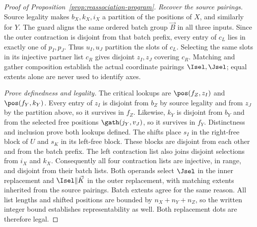 \label{app:reassociation-proof}
\begin{proof}[Proof of Proposition~\ref{prop:reassociation-program}]
\emph{Recover the source pairings.}
Source legality makes $b_X,k_X,i_X$ a partition of the positions of $X$,
and similarly for $Y$. The guard aligns the same ordered batch group $\vec B$
in all three inputs. Since the outer contraction is disjoint from that
batch prefix, every entry of $c_L$ lies in exactly one of $p_I,p_J$.
Thus $u_I,u_J$ partition the slots of $c_L$. Selecting the same slots
in its injective partner list $c_R$ gives disjoint $z_I,z_J$ covering
$c_R$. Matching and gather composition establish the actual coordinate
pairings $\Isel,\Jsel$; equal extents alone are never used to identify axes.

\emph{Prove definedness and legality.}
The critical lookups are $\pos(f_Z,z_I)$ and $\pos(f_Y,k_Y)$.
Every entry of $z_I$ is disjoint from $b_Z$ by source legality and from
$z_J$ by the partition above, so it survives in $f_Z$.
Likewise, $k_Y$ is disjoint from $b_Y$ and from the selected free positions
$\gath(j_Y,v_J)$, so it survives in $f_Y$. Distinctness and inclusion
prove both lookups defined. The shifts place $s_I$ in the right-free block
of $U$ and $s_K$ in its left-free block. These blocks are disjoint from
each other and from the batch prefix. The left contraction list also
joins disjoint selections from $i_X$ and $k_X$. Consequently all four
contraction lists are injective, in range, and disjoint from their batch
lists. Both operands select $\Jsel$ in the inner replacement and
$\Isel\Vert \vec K$ in the outer replacement, with matching extents inherited
from the source pairings. Batch extents agree for the same reason.
All list lengths and shifted positions are bounded by $n_X+n_Y+n_Z$,
so the written integer bound establishes representability as well.
Both replacement dots are therefore legal.


\end{proof}
